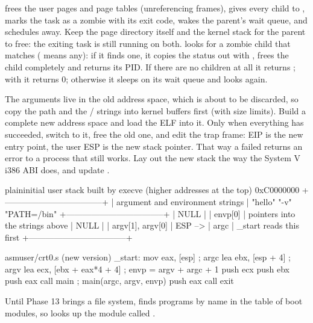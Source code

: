 \documentclass[11pt,a4paper]{article}
\begin{document}
 frees the user pages and page tables (unreferencing frames), gives every child to , marks
the task as a zombie with its exit code, wakes the parent's wait queue, and schedules away. Keep the page directory
itself and the kernel stack for the parent to free: the exiting task is still running on both. 
looks for a zombie child that matches ( means any): if it finds one, it copies the status out with
, frees the child completely and returns its PID. If there are no children at all it returns
; with  it returns 0; otherwise it sleeps on its wait queue and looks again.

The arguments live in the old address space, which is about to be discarded, so copy the path and the
/ strings into kernel buffers first (with size limits). Build a complete new address space and
load the ELF into it. Only when everything has succeeded, switch to it, free the old one, and edit the trap frame:
EIP is the new entry point, the user ESP is the new stack pointer. That way a failed  returns an error to a
process that still works. Lay out the new stack the way the System V i386 ABI does, and update .

\begin{lst}{plain}{initial user stack built by execve (higher addresses at the top)}
0xC0000000  +-----------------------------------+
            | argument and environment strings  |  "hello\0" "-v\0" "PATH=/bin\0"
            +-----------------------------------+
            | NULL                              |
            | envp[0]                           |  pointers into the strings above
            | NULL                              |
            | argv[1], argv[0]                  |
ESP  -->    | argc                              |  _start reads this first
            +-----------------------------------+
\end{lst}

\begin{lst}{asm}{user/crt0.s (new version)}
_start:
    mov  eax, [esp]             ; argc
    lea  ebx, [esp + 4]         ; argv
    lea  ecx, [ebx + eax*4 + 4] ; envp = argv + argc + 1
    push ecx
    push ebx
    push eax
    call main                   ; main(argc, argv, envp)
    push eax
    call exit
\end{lst}
Until Phase 13 brings a file system,  finds programs by name in the table of boot modules, so
 looks up the module called .
\end{document}
